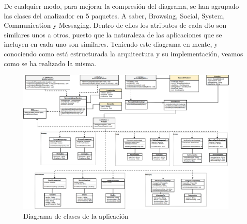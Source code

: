 \documentclass[12pt,a4paper,oneside]{book} %
\begin{document}
\newline \newline
De cualquier modo, para mejorar la compresión del diagrama, se han agrupado las clases del analizador en 5 paquetes. A saber, Browsing, Social, System, Communication y Messaging. Dentro de ellos los atributos de cada dto son similares unos a otros, puesto que la naturaleza de las aplicaciones que se incluyen en cada uno son similares. 
\newline \newline
Teniendo este diagrama en mente, y conociendo como está estructurada la arquitectura y su implementación, veamos como se ha realizado la misma. 
\begin{landscape}
\begin{figure}[htb]
\begin{center}
		\includegraphics[scale=0.32]{pictures/classDiagram/classDiagram.png} 
	\caption[Diagrama de clases de la aplicación]{Diagrama de clases de la aplicación}
	\end{center}
\end{figure}
\end{landscape}
\end{document}

